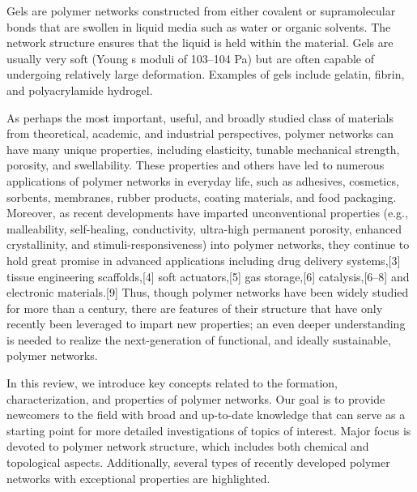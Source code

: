 \documentclass[../../main-notes.tex]{subfiles}
\begin{document}
Gels are polymer networks constructed from either covalent or supramolecular bonds that are swollen in liquid media such as water or organic solvents. 
The network structure ensures that the liquid is held within the material. 
Gels are usually very soft (Young s moduli of 103–104 Pa) but are often capable of undergoing relatively large deformation. 
Examples of gels include gelatin, fibrin, and polyacrylamide hydrogel.

As perhaps the most important, useful, and broadly studied class of materials from theoretical, academic, and industrial perspectives, polymer networks can have many unique properties, including elasticity, tunable mechanical strength, porosity, and swellability. 
These properties and others have led to numerous applications of polymer networks in everyday life, such as adhesives, cosmetics, sorbents, membranes, rubber products, coating materials, and food packaging. 
Moreover, as recent developments have imparted unconventional properties (e.g., malleability, self-healing, conductivity, ultra-high permanent porosity, enhanced crystallinity, and stimuli-responsiveness) into polymer networks, they continue to hold great promise in advanced applications including drug delivery systems,[3] tissue engineering scaffolds,[4] soft actuators,[5] gas storage,[6] catalysis,[6–8] and electronic materials.[9] 
Thus, though polymer networks have been widely studied for more than a century, there are features of their structure that have only recently been leveraged to impart new properties; an even deeper understanding is needed to realize the next-generation of functional, and ideally sustainable, polymer networks. 

In this review, we introduce key concepts related to the formation, characterization, and properties of polymer networks. 
Our goal is to provide newcomers to the field with broad and up-to-date knowledge that can serve as a starting point for more detailed investigations of topics of interest. 
Major focus is devoted to polymer network structure, which includes both chemical and topological aspects. 
Additionally, several types of recently developed polymer networks with exceptional properties are highlighted.
\end{document}
